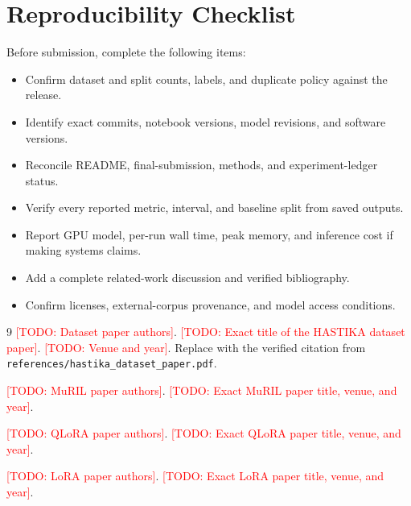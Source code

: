 \documentclass[10pt]{article}
\newcommand{\todo}[1]{\textcolor{red}{[TODO: #1]}}
\begin{document}
\section*{Reproducibility Checklist}
Before submission, complete the following items:
\begin{itemize}
  \item Confirm dataset and split counts, labels, and duplicate policy against the release.
  \item Identify exact commits, notebook versions, model revisions, and software versions.
  \item Reconcile README, final-submission, methods, and experiment-ledger status.
  \item Verify every reported metric, interval, and baseline split from saved outputs.
  \item Report GPU model, per-run wall time, peak memory, and inference cost if making systems claims.
  \item Add a complete related-work discussion and verified bibliography.
  \item Confirm licenses, external-corpus provenance, and model access conditions.
\end{itemize}


\begin{thebibliography}{9}
\todo{Dataset paper authors}.
\newblock \todo{Exact title of the HASTIKA dataset paper}.
\newblock \todo{Venue and year}. Replace with the verified citation from
\texttt{references/hastika\_dataset\_paper.pdf}.

\todo{MuRIL paper authors}.
\newblock \todo{Exact MuRIL paper title, venue, and year}.

\todo{QLoRA paper authors}.
\newblock \todo{Exact QLoRA paper title, venue, and year}.

\todo{LoRA paper authors}.
\newblock \todo{Exact LoRA paper title, venue, and year}.
\end{thebibliography}
\end{document}
